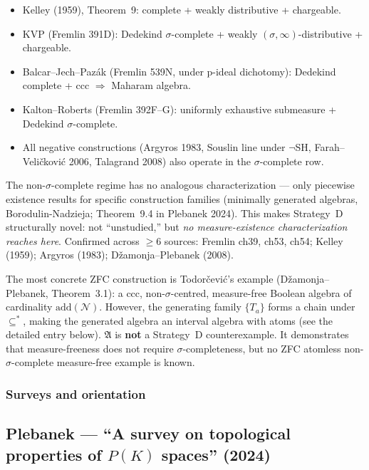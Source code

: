 \begin{itemize}[nosep]
  \item Kelley (1959), Theorem~9: complete + weakly distributive + chargeable.
  \item KVP (Fremlin 391D): Dedekind $\sigma$-complete + weakly
    $(\sigma,\infty)$-distributive + chargeable.
  \item Balcar--Jech--Paz\'{a}k (Fremlin 539N, under p-ideal dichotomy):
    Dedekind complete + ccc $\Rightarrow$ Maharam algebra.
  \item Kalton--Roberts (Fremlin 392F--G): uniformly exhaustive
    submeasure + Dedekind $\sigma$-complete.
  \item All negative constructions (Argyros 1983, Souslin line under
    $\neg$SH, Farah--Veli\v{c}kovi\'{c} 2006, Talagrand 2008) also
    operate in the $\sigma$-complete row.
\end{itemize}

\noindent
The non-$\sigma$-complete regime has no analogous characterization ---
only piecewise existence results for specific construction families
(minimally generated algebras, Borodulin-Nadzieja; Theorem~9.4 in
Plebanek 2024).  This makes Strategy~D structurally novel: not
``unstudied,'' but \emph{no measure-existence characterization reaches
here}.  Confirmed across $\geq 6$ sources: Fremlin ch39, ch53, ch54;
Kelley (1959); Argyros (1983); D\v{z}amonja--Plebanek (2008).

The most concrete ZFC construction is
Todor\v{c}evi\'{c}'s example (D\v{z}amonja--Plebanek, Theorem~3.1):
a ccc, non-$\sigma$-centred, measure-free Boolean algebra of
cardinality $\mathrm{add}(\mathcal{N})$.  However, the generating
family $\{T_a\}$ forms a chain under $\subseteq^*$, making the
generated algebra an interval algebra with atoms (see the detailed
entry below).  $\mathfrak{A}$ is \textbf{not} a Strategy~D
counterexample.  It demonstrates that measure-freeness does not
require $\sigma$-completeness, but no ZFC atomless
non-$\sigma$-complete measure-free example is known.

\subsubsection{Surveys and orientation}

\subsection*{Plebanek --- ``A survey on topological properties of
$P(K)$ spaces'' (2024)}

